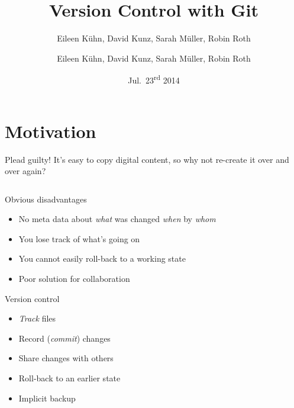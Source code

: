 \documentclass[18pt,mathserif]{beamer}
\title{Version Control with Git}
\author{Eileen K\"uhn, David Kunz, Sarah M\"uller, Robin Roth}
\subtitle{Eileen K\"uhn, David Kunz, Sarah M\"uller, Robin Roth}
\institute{KSETA Doktorandenworkshop, 23.07.2014}
\date{Jul.~23\textsuperscript{rd} 2014}
\begin{document}
\maketitle

\section{Motivation}

\begin{frame}{Plead guilty!}
  It's easy to copy digital content, so why not re-create it over and over
  again?

  \begin{columns}[onlytextwidth]

  \end{columns}
\end{frame}
\begin{frame}{Obvious disadvantages}
  \begin{itemize}
    \item No meta data about \emph{what} was changed \emph{when} by
      \emph{whom}
    \item You lose track of what's going on
    \item You cannot easily roll-back to a working state
    \item Poor solution for collaboration
  \end{itemize}
\end{frame}
\begin{frame}{Version control}
	\begin{itemize}
		\item \emph{Track} files
		\item Record (\emph{commit}) changes
		\item Share changes with others
		\item Roll-back to an earlier state
		\item Implicit backup

	\end{itemize}
\end{frame}
\end{document}
